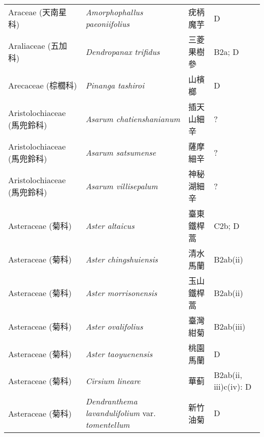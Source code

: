 \begin{longtable}{p{3cm}p{5cm}p{3cm}p{4cm}}
    Araceae (天南星科) & \textit{Amorphophallus paeoniifolius}  & 疣柄魔芋 & D \index{Amorphophallus@\textit{Amorphophallus}!paeoniifolius@\textit{paeoniifolius}}  \index{疣柄魔芋} \\
    Araliaceae (五加科) & \textit{Dendropanax trifidus}  & 三菱果樹參 & B2a; D \index{Dendropanax@\textit{Dendropanax}!trifidus@\textit{trifidus}}  \index{三菱果樹參} \\
    Arecaceae (棕櫚科) & \textit{Pinanga tashiroi}  & 山檳榔 & D \index{Pinanga@\textit{Pinanga}!tashiroi@\textit{tashiroi}}  \index{山檳榔} \\
    Aristolochiaceae (馬兜鈴科) & \textit{Asarum chatienshanianum}  & 插天山細辛 & ? \index{Asarum@\textit{Asarum}!chatienshanianum@\textit{chatienshanianum}}  \index{插天山細辛} \\
    Aristolochiaceae (馬兜鈴科) & \textit{Asarum satsumense}  & 薩摩細辛 & ? \index{Asarum@\textit{Asarum}!satsumense@\textit{satsumense}}  \index{薩摩細辛} \\
    Aristolochiaceae (馬兜鈴科) & \textit{Asarum villisepalum}  & 神秘湖細辛 & ? \index{Asarum@\textit{Asarum}!villisepalum@\textit{villisepalum}}  \index{神秘湖細辛} \\
    Asteraceae (菊科) & \textit{Aster altaicus}  & 臺東鐵桿蒿 & C2b; D \index{Aster@\textit{Aster}!altaicus@\textit{altaicus}}  \index{臺東鐵桿蒿} \\
    Asteraceae (菊科) & \textit{Aster chingshuiensis}  & 清水馬蘭 & B2ab(ii) \index{Aster@\textit{Aster}!chingshuiensis@\textit{chingshuiensis}}  \index{清水馬蘭} \\
    Asteraceae (菊科) & \textit{Aster morrisonensis}  & 玉山鐵桿蒿 & B2ab(ii) \index{Aster@\textit{Aster}!morrisonensis@\textit{morrisonensis}}  \index{玉山鐵桿蒿} \\
    Asteraceae (菊科) & \textit{Aster ovalifolius}  & 臺灣紺菊 & B2ab(iii) \index{Aster@\textit{Aster}!ovalifolius@\textit{ovalifolius}}  \index{臺灣紺菊} \\
    Asteraceae (菊科) & \textit{Aster taoyuenensis}  & 桃園馬蘭 & D \index{Aster@\textit{Aster}!taoyuenensis@\textit{taoyuenensis}}  \index{桃園馬蘭} \\
    Asteraceae (菊科) & \textit{Cirsium lineare}  & 華蓟 & B2ab(ii, iii)c(iv): D \index{Cirsium@\textit{Cirsium}!lineare@\textit{lineare}}  \index{華蓟} \\
    Asteraceae (菊科) & \textit{Dendranthema lavandulifolium} var. \textit{tomentellum}  & 新竹油菊 & D \index{Dendranthema@\textit{Dendranthema}!lavandulifolium@\textit{lavandulifolium}!var. tomentellum@var. \textit{tomentellum}}  \index{新竹油菊} \\

\end{longtable}

